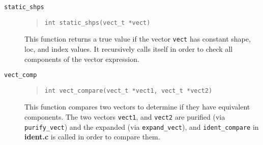 \begin{description}
\item[{\tt static\_shps}]
\begin{quote}
\begin{verbatim}
int static_shps(vect_t *vect)
\end{verbatim}
\end{quote}
This function returns a true value if the vector {\tt vect} has
constant shape, loc, and index values.  It recursively calls itself
in order to check all components of the vector expression.

\item[{\tt vect\_comp}]
\begin{quote}
\begin{verbatim}
int vect_compare(vect_t *vect1, vect_t *vect2)
\end{verbatim}
\end{quote}
This function compares two vectors to determine if they have equivalent
components.  The two vectors {\tt vect1}, and {\tt vect2} are 
purified (via {\tt purify\_vect}) and the expanded (via {\tt expand\_vect}),
and {\tt ident\_compare} in {\bf ident.c} is called in order to compare
them.
\end{description}

